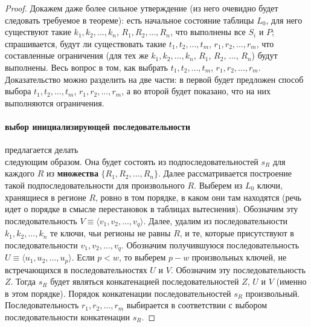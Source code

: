\theoremtext{\ref{mirror_fullness}}{\FullnessMirror}
\begin{proof}
Докажем даже более сильное утверждение (из него очевидно будет следовать требуемое в теореме): есть начальное состояние таблицы $L_0$, для него существуют такие $k_1, k_2, ..., k_n$, $R_1, R_2, ..., R_n$, что выполнены все $S_i$ и $P$; спрашивается, будут ли существовать такие $t_1, t_2, ..., t_m$, $r_1, r_2, ..., r_m$, что составленные ограничения (для тех же $k_1, k_2, ..., k_n$, $R_1$, $R_2$, ..., $R_n$) будут выполнены. Весь вопрос в том, как выбрать $t_1, t_2, ..., t_m$, $r_1, r_2, ..., r_m$. Доказательство можно разделить на две части: в первой будет предложен способ выбора $t_1, t_2, ..., t_m$, $r_1, r_2, ..., r_m$, а во второй будет показано, что на них выполняются ограничения.

\paragraph{выбор инициализирующей последовательности} предлагается делать\\следующим образом. Она будет состоять из подпоследовательностей $s_R$ для каждого $R$ из \textbf{множества} $\{R_1, R_2, ..., R_n\}$. Далее рассматривается построение такой подпоследовательности для произвольного $R$. Выберем из $L_0$ ключи, хранящиеся в регионе $R$, ровно в том порядке, в каком они там находятся (речь идет о порядке в смысле перестановок в таблицах вытеснения). Обозначим эту последовательность $V \equiv \langle v_1, v_2, ..., v_q \rangle$. Далее, удалим из последовательности $k_1, k_2, ..., k_n$ те ключи, чьи регионы не равны $R$, и те, которые присутствуют в последовательности $v_1, v_2, ..., v_q$. Обозначим получившуюся последовательность $U \equiv \langle u_1, u_2, ..., u_p\rangle$. Если $p < w$, то выберем $p{-}w$ произвольных ключей, не встречающихся в последовательностях $U$ и $V$. Обозначим эту последовательность $Z$. Тогда $s_R$ будет являться конкатенацией последовательностей $Z$, $U$ и $V$ (именно в этом порядке). Порядок конкатенации последовательностей $s_R$ произвольный. Последовательность $r_1, r_2, ..., r_m$ выбирается в соответствии с выбором последовательности конкатенации $s_R$.


\end{proof}
